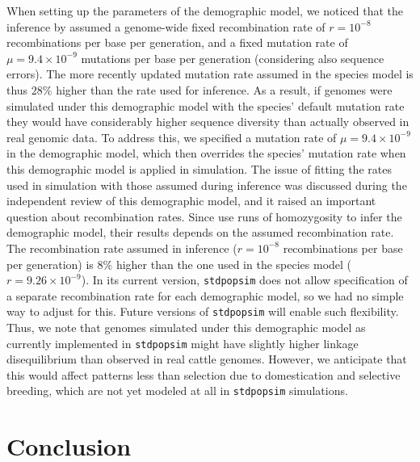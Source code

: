 \documentclass[hidelinks]{article}
\newcommand{\stdpopsim}{\texttt{stdpopsim}\xspace}
\begin{document}
When setting up the parameters of the demographic model, we noticed that the inference by \cite{MacLeod2013} assumed a genome-wide fixed recombination rate of
$r=10^{-8}$ recombinations per base per generation,
and a fixed mutation rate of
$\mu=9.4 \times 10^{-9}$ mutations per base per generation (considering also sequence errors).
The more recently updated mutation rate assumed in the species model
\citep[$1.2\times 10^{-8}$ mutations per base per generation, from][]{Harland2017}
is thus \(28\%\) higher than the rate used for inference.
As a result, if genomes were simulated under this demographic model with the species' default mutation rate they would have considerably higher sequence diversity than actually observed in real genomic data.
To address this, we specified a mutation rate of \(\mu=9.4 \times 10^{-9}\) in the demographic model,
which then overrides the species' mutation rate when this demographic model is applied in simulation.
The issue of fitting the rates used in simulation with those assumed during inference was discussed during the independent review of this demographic model, and it raised an important question about recombination rates. Since \cite{MacLeod2013} use runs of homozygosity to infer the demographic model, their results depends on the assumed recombination rate. The recombination rate assumed in inference
(\(r=10^{-8}\) recombinations per base per generation) is \(8\%\) higher than the one used in the species model (\(r=9.26\times 10^{-9}\)). In its current version, \stdpopsim does not allow specification of a separate recombination rate for each demographic model, so we had no simple way to adjust for this. Future versions of \stdpopsim will enable such flexibility. Thus, we note that genomes simulated under this demographic model as currently implemented in \stdpopsim 
might have slightly higher linkage disequilibrium than observed in real cattle genomes.
However, we anticipate that this would affect patterns less
than selection due to domestication and selective breeding,
which are not yet modeled at all in \stdpopsim simulations.

\section*{Conclusion}
    \label{conclusion}
\end{document}
